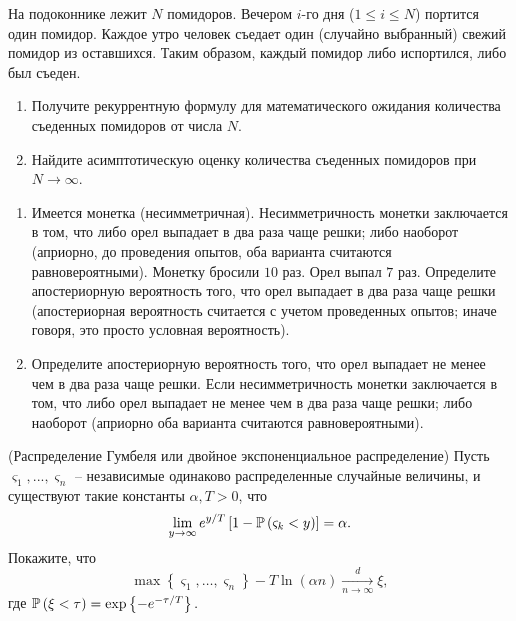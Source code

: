 \begin{problem}\Star
На подоконнике лежит $N$ помидоров. Вечером $i$-го дня ($1 \leqslant i \leqslant N$) портится один помидор. Каждое утро человек съедает один (случайно выбранный) свежий помидор из оставшихся. Таким образом, каждый помидор либо испортился, либо был съеден.

\begin{enumerate}
\item Получите рекуррентную формулу для математического ожидания количества съеденных помидоров от числа $N$.
\item Найдите асимптотическую оценку количества съеденных помидоров при $N \rightarrow \infty$.
\end{enumerate}

\end{problem}

\begin{problem}
\begin{enumerate}
\item Имеется монетка (несимметричная). Несимметричность монетки заключается в том, что либо орел выпадает в два раза чаще решки; 
либо наоборот (априорно, до проведения опытов, оба варианта считаются равновероятными). Монетку бросили $10$ раз. Орел выпал $7$ раз. 
Определите апостериорную вероятность того, что орел выпадает в два раза чаще решки (апостериорная вероятность считается с учетом 
проведенных опытов; иначе говоря, это просто условная вероятность). 

\item Определите апостериорную вероятность того, что орел выпадает не менее чем в два раза чаще решки. Если несимметричность 
монетки заключается в том, что либо орел выпадает не менее чем в два раза чаще решки; либо наоборот (априорно оба варианта считаются 
равновероятными). 
\end{enumerate}
\end{problem}





\begin{problem}(Распределение Гумбеля или двойное экспоненциальное распределение)
\label{gumbel}
Пусть $\varsigma _{1} ,...,\varsigma _{n} $ -- независимые одинаково распределенные случайные величины, и существуют такие константы $\alpha ,T>0$, что
\[\mathop{\lim }\limits_{y\to \infty } e^{{y\mathord{\left/ {\vphantom {y T}} \right. \kern-\nulldelimiterspace} T} } \left[1-\PR\left(\varsigma _{k} <y\right)\right]=\alpha. \] 
Покажите, что
\[
\max \left\{\varsigma _{1},\ldots,\varsigma _{n} \right\}-T\ln \left(\alpha n\right)\xrightarrow[{n\to \infty }]{d} \xi,  
\]
\noindent где $\PR\left(\xi <\tau \right)=\exp \left\{-e^{-{\tau \mathord{\left/ {\vphantom {\tau  T}} \right. \kern-\nulldelimiterspace} T} } \right\}.$

\end{problem}


